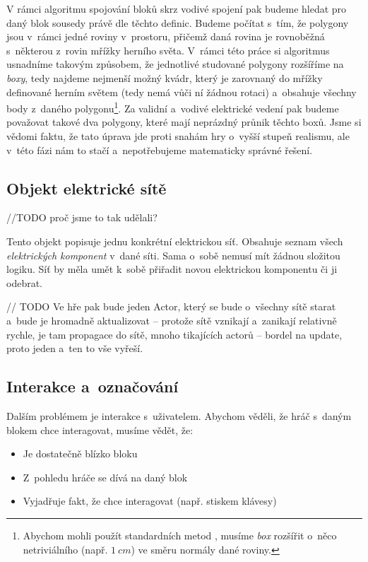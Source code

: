 V rámci algoritmu spojování bloků skrz vodivé spojení pak budeme hledat pro daný blok sousedy právě dle těchto definic. Budeme počítat s~tím, že polygony jsou v~rámci jedné roviny v~prostoru, přičemž daná rovina je rovnoběžná s~některou z~rovin mřížky herního světa. V~rámci této práce si algoritmus usnadníme takovým způsobem, že jednotlivé studované polygony rozšíříme na \textit{boxy}, tedy najdeme nejmenší možný kvádr, který je zarovnaný do mřížky definované herním světem (tedy nemá vůči ní žádnou rotaci) a~obsahuje všechny body z~daného polygonu\footnote{Abychom mohli použít standardních metod , musíme \textit{box} rozšířit o~něco netriviálního (např. $1~cm$) ve směru normály dané roviny.}. Za validní a~vodivé elektrické vedení pak budeme považovat takové dva polygony, které mají neprázdný průnik těchto boxů. Jsme si vědomi faktu, že tato úprava jde proti snahám hry o~vyšší stupeň realismu, ale v~této fázi nám to stačí a~nepotřebujeme matematicky správné řešení.


\subsection{Objekt elektrické sítě}

//TODO proč jsme to tak udělali?

Tento objekt popisuje jednu konkrétní elektrickou síť. Obsahuje seznam všech \textit{elektrických komponent} v~dané síti. Sama o~sobě nemusí mít žádnou složitou logiku. Síť by měla umět k~sobě přiřadit novou elektrickou komponentu či ji odebrat. 


// TODO
Ve hře pak bude jeden Actor, který se bude o~všechny sítě starat a~bude je hromadně aktualizovat -- protože sítě vznikají a~zanikají relativně rychle, je tam propagace do sítě, mnoho tikajících actorů -- bordel na update, proto jeden a~ten to vše vyřeší.



\subsection{Interakce a~označování}
\label{subsec:interaction}

Dalším problémem je interakce s~uživatelem. Abychom věděli, že hráč s~daným blokem chce interagovat, musíme vědět, že:
\begin{itemize}
	\item Je dostatečně blízko bloku
	\item Z~pohledu hráče se dívá na daný blok 
	\item Vyjadřuje fakt, že chce interagovat (např. stiskem klávesy)
\end{itemize}



